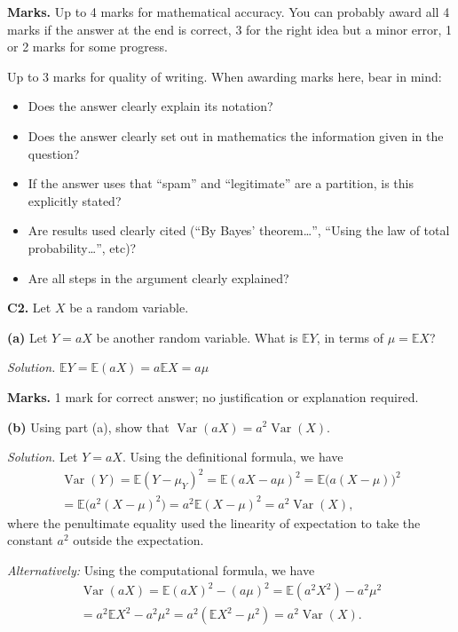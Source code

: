 \documentclass[
  a4paper,
]{book}
\providecommand{\tightlist}{%
  \setlength{\itemsep}{0pt}\setlength{\parskip}{0pt}}
\theoremstyle{definition}
\theoremstyle{definition}
\theoremstyle{definition}
\theoremstyle{definition}
\theoremstyle{remark}
\begin{document}
\begin{myanswers}
\textbf{Marks.} Up to 4 marks for mathematical accuracy. You can probably award all 4 marks if the answer at the end is correct, 3 for the right idea but a minor error, 1 or 2 marks for some progress.

Up to 3 marks for quality of writing. When awarding marks here, bear in mind:

\begin{itemize}
\tightlist
\item
  Does the answer clearly explain its notation?
\item
  Does the answer clearly set out in mathematics the information given in the question?
\item
  If the answer uses that ``spam'' and ``legitimate'' are a partition, is this explicitly stated?
\item
  Are results used clearly cited (``By Bayes' theorem\ldots{}'', ``Using the law of total probability\ldots{}'', etc)?
\item
  Are all steps in the argument clearly explained?
\end{itemize}

\end{myanswers}

\textbf{C2.} Let \(X\) be a random variable.

\textbf{(a)} Let \(Y = aX\) be another random variable. What is \(\mathbb EY\), in terms of \(\mu = \mathbb EX\)?

\begin{myanswers}
\emph{Solution.} \(\mathbb EY = \mathbb E(aX) = a \mathbb EX = a\mu\)

\textbf{Marks.} 1 mark for correct answer; no justification or explanation required.

\end{myanswers}

\textbf{(b)} Using part (a), show that \(\operatorname{Var}(aX) = a^2 \operatorname{Var}(X)\).

\begin{myanswers}
\emph{Solution.}
Let \(Y = aX\). Using the definitional formula, we have
\begin{multline}
\operatorname{Var}(Y) = \mathbb E(Y - \mu_Y)^2 = \mathbb E(aX - a\mu)^2 = \mathbb E\big(a(X-\mu)\big)^2 \\
= \mathbb E \big(a^2(X-\mu)^2\big) = a^2 \mathbb E(X - \mu)^2 = a^2 \operatorname{Var}(X) ,
\end{multline}
where the penultimate equality used the linearity of expectation to take the constant \(a^2\) outside the expectation.

\emph{Alternatively:} Using the computational formula, we have
\begin{multline}
\operatorname{Var}(aX) = \mathbb E(aX)^2 - (a\mu)^2 = \mathbb E(a^2X^2) - a^2 \mu^2 \\
= a^2 \mathbb EX^2 - a^2\mu^2 = a^2 (\mathbb EX^2 - \mu^2) = a^2 \operatorname{Var}(X) .
\end{multline}

\end{myanswers}
\end{document}

